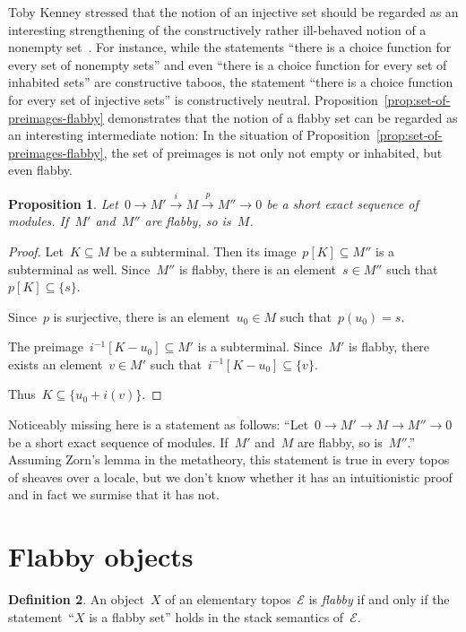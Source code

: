 \documentclass[oneside]{amsart}
\theoremstyle{definition}
\newtheorem{defn}{Definition}[section]
\theoremstyle{plain}
\newtheorem{prop}[defn]{Proposition}
\theoremstyle{remark}
\newcommand{\xra}[1]{\xrightarrow{#1}}
\newcommand{\E}{\mathcal{E}}
\renewcommand{\_}{\mathpunct{.}\,}
\begin{document}
Toby Kenney stressed that the notion of an injective set should be regarded as an
interesting strengthening of the constructively rather ill-behaved notion of a
nonempty set~\cite{kenney:injective-choice}. For instance, while the statements
``there is a choice function for every set of nonempty sets'' and even ``there
is a choice function for every set of inhabited sets'' are constructive taboos,
the statement ``there is a choice function for every set of injective sets'' is
constructively neutral. Proposition~\ref{prop:set-of-preimages-flabby} demonstrates
that the notion of a flabby set can be regarded as an interesting intermediate
notion: In the situation of Proposition~\ref{prop:set-of-preimages-flabby}, the
set of preimages is not only not empty or inhabited, but even flabby.

\begin{prop}Let~$0 \to M' \xra{i} M \xra{p} M'' \to 0$ be a short exact
sequence of modules. If~$M'$ and~$M''$ are flabby, so is~$M$.
\end{prop}

\begin{proof}Let~$K \subseteq M$ be a subterminal. Then its image~$p[K] \subseteq M''$
is a subterminal as well. Since~$M''$ is flabby, there is an element~$s \in
M''$ such that~$p[K] \subseteq \{ s \}$.

Since~$p$ is surjective, there is an element~$u_0 \in M$ such that~$p(u_0) =
s$.

The preimage~$i^{-1}[K - u_0] \subseteq M'$ is a subterminal. Since~$M'$ is
flabby, there exists an element~$v \in M'$ such that~$i^{-1}[K - u_0] \subseteq
\{v\}$.

Thus~$K \subseteq \{ u_0 + i(v) \}$.
\end{proof}

Noticeably missing here is a statement as follows: ``Let~$0 \to M' \to M \to
M'' \to 0$ be a short exact sequence of modules. If~$M'$ and~$M$ are flabby, so
is~$M''$.'' Assuming Zorn's lemma in the metatheory, this statement is true in
every topos of sheaves over a locale, but we don't know whether it has an
intuitionistic proof and in fact we surmise that it has not.


\section{Flabby objects}
\label{sect:flabby-objects}

\begin{defn}An object~$X$ of an elementary topos~$\E$ is \emph{flabby} if and
only if the statement~``$X$ is a flabby set'' holds in the stack semantics
of~$\E$.\end{defn}
\end{document}
